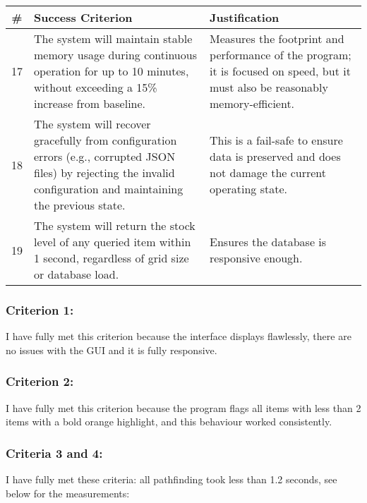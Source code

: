 		\begin{table}[htbp]
		\centering
		\begin{tabularx}{\textwidth}{|c|X|X|}
		\hline
		\textbf{\#} & \textbf{Success Criterion} & \textbf{Justification} \\
		\hline
		17 & The system will maintain stable memory usage during continuous operation for up to 10 minutes, without exceeding a 15\% increase from baseline. & Measures the footprint and performance of the program; it is focused on speed, but it must also be reasonably memory-efficient. \\
		\hline
		18 & The system will recover gracefully from configuration errors (e.g., corrupted JSON files) by rejecting the invalid configuration and maintaining the previous state. & This is a fail-safe to ensure data is preserved and does not damage the current operating state. \\
		\hline
		19 & The system will return the stock level of any queried item within 1 second, regardless of grid size or database load. & Ensures the database is responsive enough. \\
		\hline
	\end{tabularx}
\end{table}

\subsubsection{Criterion 1:}
I have fully met this criterion because the interface displays flawlessly, there are no issues with the GUI and it is fully responsive.

\subsubsection{Criterion 2:}
I have fully met this criterion because the program flags all items with less than 2 items with a bold orange highlight, and this behaviour worked consistently.

\subsubsection{Criteria 3 and 4:}

I have fully met these criteria: all pathfinding took less than 1.2 seconds, see below for the measurements:

